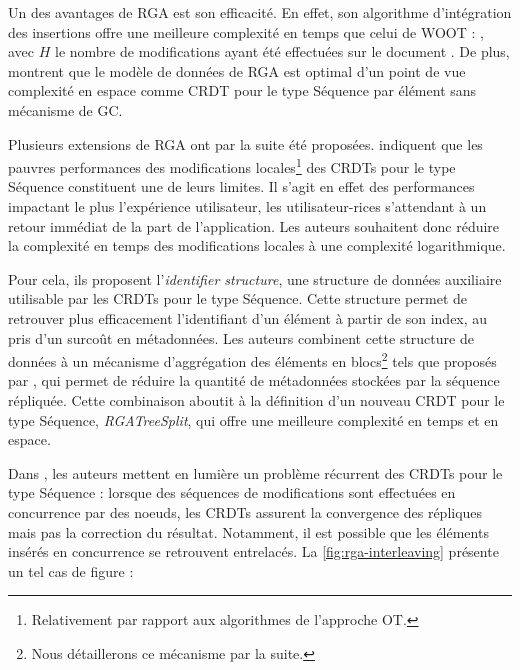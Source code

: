 Un des avantages de \ac{RGA} est son efficacité.
En effet, son algorithme d'intégration des insertions offre une meilleure complexité en temps que celui de WOOT : , avec $H$ le nombre de modifications ayant été effectuées sur le document \cite{2011-evaluation-crdts-ahmed-nacer}.
De plus, \cite{2016-specification-complexity-collaborative-text-editing-attiya,2021-specification-complexity-collaborative-text-editing-attiya} montrent que le modèle de données de \ac{RGA} est optimal d'un point de vue complexité en espace comme \ac{CRDT} pour le type Séquence par élément sans mécanisme de \ac{GC}.

Plusieurs extensions de \ac{RGA} ont par la suite été proposées.
\textcite{briot:hal-01343941} indiquent que les pauvres performances des modifications locales\footnote{Relativement par rapport aux algorithmes de l'approche \ac{OT}.} des \acp{CRDT} pour le type Séquence constituent une de leurs limites.
Il s'agit en effet des performances impactant le plus l'expérience utilisateur, les utilisateur-rices s'attendant à un retour immédiat de la part de l'application.
Les auteurs souhaitent donc réduire la complexité en temps des modifications locales à une complexité logarithmique.

Pour cela, ils proposent l'\emph{identifier structure}, une structure de données auxiliaire utilisable par les \acp{CRDT} pour le type Séquence.
Cette structure permet de retrouver plus efficacement l'identifiant d'un élément à partir de son index, au pris d'un surcoût en métadonnées.
Les auteurs combinent cette structure de données à un mécanisme d'aggrégation des éléments en blocs\footnote{Nous détaillerons ce mécanisme par la suite.} tels que proposés par \cite{2012-string-wise,2013-logootsplit}, qui permet de réduire la quantité de métadonnées stockées par la séquence répliquée.
Cette combinaison aboutit à la définition d'un nouveau \ac{CRDT} pour le type Séquence, \emph{RGATreeSplit}, qui offre une meilleure complexité en temps et en espace.

Dans \cite{2019-interleaving-anomalies-collaborative-editors-kleppmann}, les auteurs mettent en lumière un problème récurrent des \acp{CRDT} pour le type Séquence : lorsque des séquences de modifications sont effectuées en concurrence par des noeuds, les \acp{CRDT} assurent la convergence des répliques mais pas la correction du résultat.
Notamment, il est possible que les éléments insérés en concurrence se retrouvent entrelacés.
La \autoref{fig:rga-interleaving} présente un tel cas de figure :

